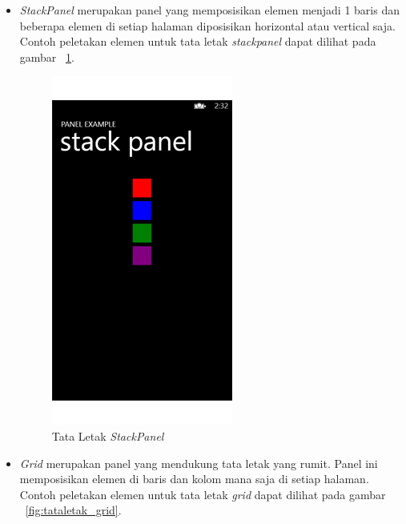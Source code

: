 \begin{itemize} %
	\item \textit{StackPanel} merupakan panel yang memposisikan elemen menjadi 1 baris dan beberapa elemen di setiap halaman diposisikan horizontal atau vertical saja. Contoh peletakan elemen untuk tata letak \textit{stackpanel} dapat dilihat pada gambar ~\ref{fig:tataletak_stackpanel}.
	
	\begin{figure}[h!]
		\centering
			\includegraphics[scale=0.4]{Gambar/TataLetak/stackpanel}
		\caption{Tata Letak \textit{StackPanel}}
		\label{fig:tataletak_stackpanel}
	\end{figure}

	\item \textit{Grid} merupakan panel yang mendukung tata letak yang rumit. Panel ini memposisikan elemen di baris dan kolom mana saja di setiap halaman. Contoh peletakan elemen untuk tata letak \textit{grid} dapat dilihat pada gambar ~\ref{fig:tataletak_grid}.
	

\end{itemize}
